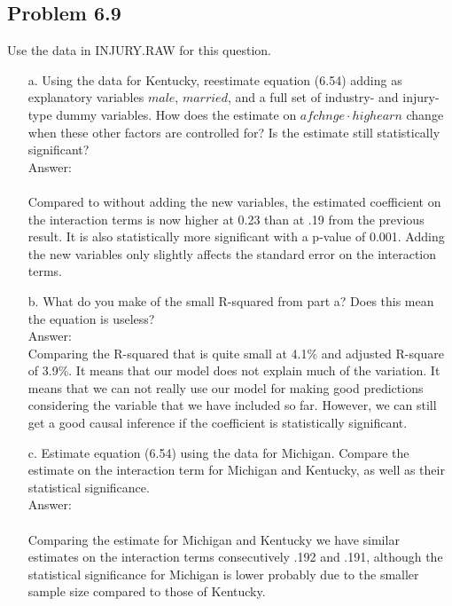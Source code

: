 \documentclass[10pt]{article}
\begin{document}
\subsection*{Problem 6.9}
Use the data in INJURY.RAW for this question. 
\begin{enumerate}
\item[a.] Using the data for Kentucky, reestimate equation (6.54) adding as explanatory variables $male$, $married$, and a full set of industry- and injury-type dummy variables. How does the estimate on $afchnge\cdot highearn$ change when these other factors are controlled for? Is the estimate still statistically significant? 
\\ Answer: \\ \\

Compared to without adding the new variables, the estimated coefficient on the interaction terms is now higher at 0.23 than at .19 from the previous result. It is also statistically more significant with a p-value of 0.001. Adding the new variables only slightly affects the standard error on the interaction terms. 

\item[b.] What do you make of the small R-squared from part a? Does this mean the equation is useless? 
\\ Answer: \\
Comparing the R-squared that is quite small at 4.1\% and adjusted R-square of 3.9\%. It means that our model does not explain much of the variation. It means that we can not really use our model for making good predictions considering the variable that we have included so far. However, we can still get a good causal inference if the coefficient is statistically significant.

\item[c.] Estimate equation (6.54) using the data for Michigan. Compare the estimate on the interaction term for Michigan and Kentucky, as well as their statistical significance.
\\ Answer: \\ \\

Comparing the estimate for Michigan and Kentucky we have similar estimates on the interaction terms consecutively .192 and .191, although the statistical significance for Michigan is lower probably due to the smaller sample size compared to those of Kentucky.

\end{enumerate}
\end{document}
